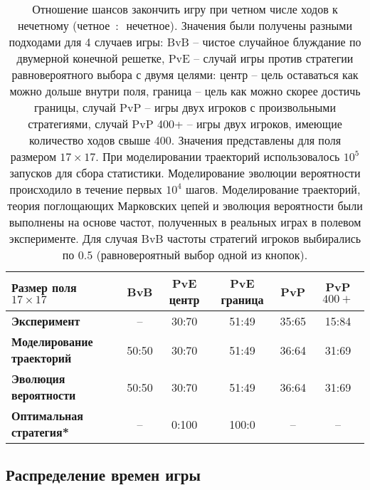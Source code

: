 \begin{table}[t]
    \fontsize{10pt}{10pt}\selectfont
    \begin{tabular}{|l|c|c|c|c|c|}
        \toprule
        Размер поля $17 \times 17$ & \textbf{BvB} & \textbf{PvE центр} & \textbf{PvE граница} & \textbf{PvP} & \textbf{PvP $400+$} \\
        \midrule
        \textbf{Эксперимент} & --     & 30:70 & 51:49 & 35:65 & 15:84 \\
        \textbf{Моделирование траекторий} & 50:50 & 30:70 & 51:49 & 36:64 & 31:69 \\
        \textbf{Эволюция вероятности}  & 50:50 & 30:70 & 51:49 & 36:64 & 31:69 \\
        \textbf{Оптимальная стратегия*}    & --     & 0:100 & 100:0 & --   & --     \\
        \bottomrule
    \end{tabular}
    \caption{
        Отношение шансов закончить игру при четном числе ходов к нечетному (четное~$:$~нечетное). Значения были получены разными подходами для 4 случаев игры: BvB -- чистое случайное блуждание по двумерной конечной решетке, PvE -- случай игры против стратегии равновероятного выбора с двумя целями: центр -- цель оставаться как можно дольше внутри поля, граница -- цель как можно скорее достичь границы, случай PvP -- игры двух игроков с произвольными стратегиями, случай PvP 400+ -- игры двух игроков, имеющие количество ходов свыше 400. Значения представлены для поля размером $17 \times 17$. При моделировании траекторий использовалось $10^5$ запусков для сбора статистики. Моделирование эволюции вероятности происходило в течение первых $10^4$ шагов. Моделирование траекторий, теория поглощающих Марковских цепей и эволюция вероятности были выполнены на основе частот, полученных в реальных играх в полевом эксперименте. Для случая BvB частоты стратегий игроков выбирались по $0.5$ (равновероятный выбор одной из кнопок).
    }
    \label{tab:parity}
\end{table}

\subsection{Распределение времен игры}\label{subsec:ch3/sec4/sub3}


